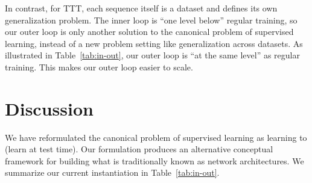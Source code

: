 \documentclass{article}
\begin{document}
In contrast, for TTT, each sequence itself is a dataset and defines its own generalization problem. The inner loop is “one level below” regular training, so our outer loop is only another solution to the canonical problem of supervised learning,
instead of a new problem setting like generalization across datasets.
As illustrated in Table~\ref{tab:in-out}, our outer loop is ``at the same level'' as regular training.
This makes our outer loop easier to scale.

\renewcommand{\arraystretch}{1.6}
\begin{table}[t]
\vspace{-4ex}
\centering
{}
\caption{
In summary, our paper reformulates supervised learning as learning to learn, with two nested loops.
Highlighted rows of the outer loop are the same as in the regular training.
Parameters of the outer loop become hyper-parameters of the inner loop.
Intuitively, the inner loop, \textit{i.e.} TTT, is ``one level below'' regular training.
}
\label{tab:in-out}
\end{table}

\section{Discussion}
We have reformulated the canonical problem of supervised learning as learning to (learn at test time).
Our formulation produces an alternative conceptual framework for building what is traditionally known as network architectures.
We summarize our current instantiation in Table~\ref{tab:in-out}.
\end{document}
